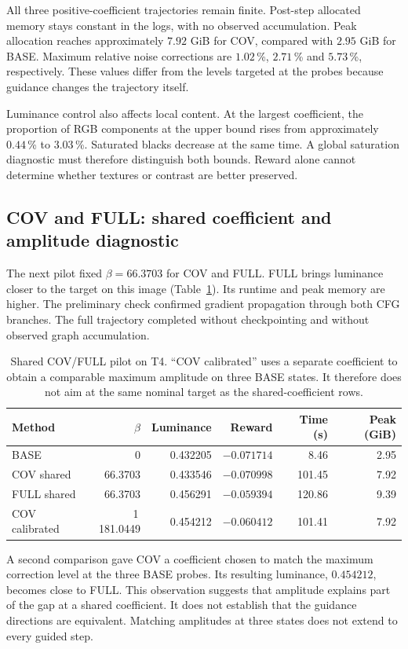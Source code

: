 \documentclass[11pt,a4paper]{article}
\begin{document}
All three positive-coefficient trajectories remain finite. Post-step allocated memory stays constant in the logs, with no observed accumulation. Peak allocation reaches approximately $7.92$ GiB for COV, compared with $2.95$ GiB for BASE. Maximum relative noise corrections are $1.02$\,\%, $2.71$\,\% and $5.73$\,\%, respectively. These values differ from the levels targeted at the probes because guidance changes the trajectory itself.

Luminance control also affects local content. At the largest coefficient, the proportion of RGB components at the upper bound rises from approximately $0.44$\,\% to $3.03$\,\%. Saturated blacks decrease at the same time. A global saturation diagnostic must therefore distinguish both bounds. Reward alone cannot determine whether textures or contrast are better preserved.

\subsection{COV and FULL: shared coefficient and amplitude diagnostic}
The next pilot fixed $\beta=66.3703$ for COV and FULL. FULL brings luminance closer to the target on this image (Table~\ref{tab:full}). Its runtime and peak memory are higher. The preliminary check confirmed gradient propagation through both CFG branches. The full trajectory completed without checkpointing and without observed graph accumulation.
\begin{table}[htbp]
\centering\small
\setlength{\tabcolsep}{4pt}
\begin{tabular}{lrrrrr}
\toprule
Method & $\beta$ & Luminance & Reward & Time (s) & Peak (GiB)\\
\midrule
BASE & 0 & 0.432205 & $-0.071714$ & 8.46 & 2.95\\
COV shared & 66.3703 & 0.433546 & $-0.070998$ & 101.45 & 7.92\\
FULL shared & 66.3703 & 0.456291 & $-0.059394$ & 120.86 & 9.39\\
COV calibrated & 1\,181.0449 & 0.454212 & $-0.060412$ & 101.41 & 7.92\\
\bottomrule
\end{tabular}
\caption{Shared COV/FULL pilot on T4. ``COV calibrated'' uses a separate coefficient to obtain a comparable maximum amplitude on three BASE states. It therefore does not aim at the same nominal target as the shared-coefficient rows.}
\label{tab:full}
\end{table}

A second comparison gave COV a coefficient chosen to match the maximum correction level at the three BASE probes. Its resulting luminance, $0.454212$, becomes close to FULL. This observation suggests that amplitude explains part of the gap at a shared coefficient. It does not establish that the guidance directions are equivalent. Matching amplitudes at three states does not extend to every guided step.
\end{document}
